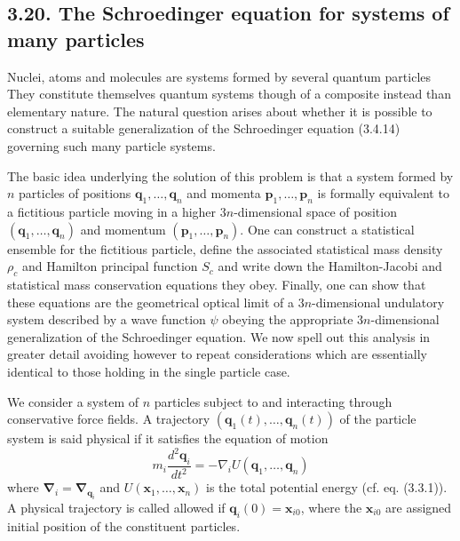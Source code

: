 \documentclass{article}
\begin{document}
\subsection*{3.20. The Schroedinger equation for systems of many particles}

Nuclei, atoms and molecules are systems formed by several quantum particles They constitute themselves quantum systems though of a composite instead than elementary nature. The natural question arises about whether it is possible to construct a suitable generalization of the Schroedinger equation (3.4.14) governing such many particle systems.

The basic idea underlying the solution of this problem is that a system formed by $n$ particles of positions $\boldsymbol{q}_{1}, \ldots, \boldsymbol{q}_{n}$ and momenta $\boldsymbol{p}_{1}, \ldots, \boldsymbol{p}_{n}$ is formally equivalent to a fictitious particle moving in a higher $3 n$-dimensional space of position $\left(\boldsymbol{q}_{1}, \ldots, \boldsymbol{q}_{n}\right)$ and momentum $\left(\boldsymbol{p}_{1}, \ldots, \boldsymbol{p}_{n}\right)$. One can construct a statistical ensemble for the fictitious particle, define the associated statistical mass density $\rho_{c}$ and Hamilton principal function $S_{c}$ and write down the Hamilton-Jacobi and statistical mass conservation equations they obey. Finally, one can show that these equations are the geometrical optical limit of a $3 n$-dimensional undulatory system described by a wave function $\psi$ obeying the appropriate $3 n$-dimensional generalization of the Schroedinger equation. We now spell out this analysis in greater detail avoiding however to repeat considerations which are essentially identical to those holding in the single particle case.

We consider a system of $n$ particles subject to and interacting through conservative force fields. A trajectory $\left(\boldsymbol{q}_{1}(t), \ldots, \boldsymbol{q}_{n}(t)\right)$ of the particle system is said physical if it satisfies the equation of motion
$$
\begin{equation*}
m_{i} \frac{d^{2} \boldsymbol{q}_{i}}{d t^{2}}=-\nabla_{i} U\left(\boldsymbol{q}_{1}, \ldots, \boldsymbol{q}_{n}\right) \tag{3.20.1}
\end{equation*}
$$
where $\boldsymbol{\nabla}_{i}=\boldsymbol{\nabla}_{\boldsymbol{q}_{i}}$ and $U\left(\boldsymbol{x}_{1}, \ldots, \boldsymbol{x}_{n}\right)$ is the total potential energy (cf. eq. (3.3.1)). A physical trajectory is called allowed if $\boldsymbol{q}_{i}(0)=\boldsymbol{x}_{i 0}$, where the $\boldsymbol{x}_{i 0}$ are assigned initial position of the constituent particles.
\end{document}
